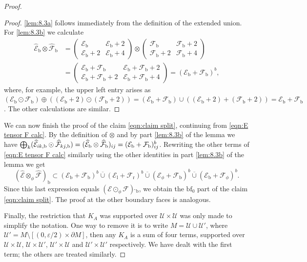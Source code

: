 \documentclass[JEP,XML,SOM,Unicode,NoFloatCountersInSection,published]{cedram}
\theoremstyle{plain}
\theoremstyle{definition}
\newcommand{\Umath}{{\mathscr{U}}}
\newcommand\calE{{\mathcal E}}
\newcommand\calF{{\mathcal F}}
\newcommand{\calEwhat}{{\widehat{\calE}}}
\newcommand{\calFwhat}{{\widehat{\calF}}}
\newcommand{\bb}{{\mathrm{b}}}
\renewcommand{\ll}{{\mathrm{l}}}
\newcommand{\rr}{{\mathrm{r}}}
\newcommand{\bbf}{{\mathrm{bf}}}
\newcommand{\dM}{{\partial M}}
\newcommand{\ocup}{\mathbin{\overline{\cup}}}
\let\eps\varepsilon
\begin{document}
\begin{proof}
\begin{proof}
\eqref{lem:8.3a} follows immediately from the definition of the extended union. For \eqref{lem:8.3b} we calculate
\begin{align*}
\calEwhat_\bb\otimes \calFwhat_\bb
&=
\begin{pmatrix}
\calE_\bb & \calE_\bb+2 \\
\calE_\bb+2 & \calE_\bb+4
\end{pmatrix}
\otimes
\begin{pmatrix}
\calF_\bb & \calF_\bb+2 \\
\calF_\bb+2 & \calF_\bb+4
\end{pmatrix}
\\ &=
\begin{pmatrix}
\calE_\bb+\calF_\bb & \calE_\bb+\calF_\bb+2 \\
\calE_\bb+\calF_\bb+2 & \calE_\bb+\calF_\bb+4
\end{pmatrix}
= (\calE_\bb+\calF_\bb)^b,
\end{align*}
where, for example, the upper left entry arises as
$(\calE_\bb \odot \calF_\bb) \oplus
((\calE_\bb+2) \odot (\calF_\bb+2))
=
(\calE_\bb + \calF_\bb) \cup
((\calE_\bb+2) + (\calF_\bb+2))
= \calE_\bb + \calF_\bb$.
The other calculations are similar.
\end{proof}
We can now finish the proof of the claim \eqref{eqn:claim split}, continuing from \eqref{eqn:E tensor F calc}. By the definition of $\otimes$ and by part \eqref{lem:8.3b} of the lemma we have
$ \bigoplus_k (\calEwhat_{ik,\bb} \odot \calFwhat_{kj,\bb}) = (\calEwhat_\bb\otimes\nobreak\calFwhat_\bb)_{ij} = (\calE_\bb+\calF_\bb)^b_{ij}$.
Rewriting the other terms of \eqref{eqn:E tensor F calc} similarly using the other identities in part \eqref{lem:8.3b} of the lemma we get\vspace*{-3pt}
\[
(\calEwhat \otimes_\phi \calFwhat)_\bb \subset
(\calE_\bb+\calF_\bb)^b \ocup (\calE_\ll+\calF_\rr)^b \ocup (\calE_\phi+\calF_\bb)^b \ocup (\calE_\bb+\calF_\phi)^b.
\]
Since this last expression equals $(\calE\odot_\phi \calF)\,\widehat{}_\bb$,
we obtain the $\bbf_0$ part of the claim \eqref{eqn:claim split}.
The proof at the other boundary faces is analogous.

Finally, the restriction that $K_A$ was supported over $\Umath\times\Umath$ was only made to simplify the notation. One way to remove it is to write $M=\Umath\cup\Umath'$, where \hbox{$\Umath'=M\setminus[(0,\eps/2)\times\dM]$}, then any $K_A$ is a sum of four terms, supported over $\Umath\times\Umath$, $\Umath\times\Umath'$, $\Umath'\times\Umath$
and $\Umath'\times\Umath'$ respectively. We have dealt with the first term; the others are treated similarly.
\end{proof}
\end{document}
